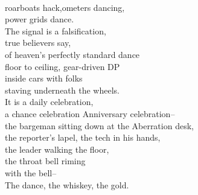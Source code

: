 \documentclass[smalldemyvopaper,11pt,twoside,onecolumn,openright,extrafontsizes]{memoir}
\begin{document}
\\roarboats hack,ometers dancing,
\\power grids dance.
\\The signal is a falsification,
\\true believers say,
\\of heaven's perfectly standard dance
\\floor to ceiling, gear-driven DP
\\inside cars with folks
\\staving underneath the wheels.
\\It is a daily celebration,
\\a chance celebration Anniversary celebration--
\\the bargeman sitting down at the Aberration desk,
\\the reporter's lapel, the tech in his hands,
\\the leader walking the floor,
\\the throat bell riming
\\with the bell--
\\The dance, the whiskey, the gold.
\end{document}
